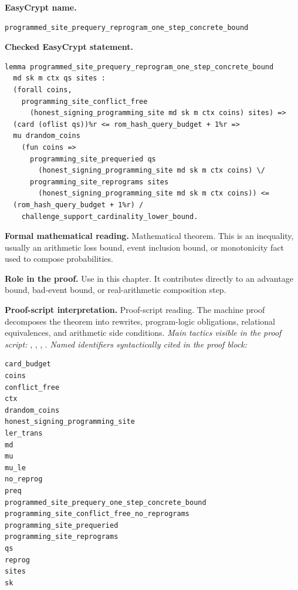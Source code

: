 \begin{formaltheorem}
\noindent\textbf{EasyCrypt name.}
\begin{lstlisting}[language=EasyCrypt,basicstyle=\ttfamily\scriptsize]
programmed_site_prequery_reprogram_one_step_concrete_bound
\end{lstlisting}
\noindent\textbf{Checked EasyCrypt statement.}
\begin{lstlisting}[language=EasyCrypt,basicstyle=\ttfamily\scriptsize]
lemma programmed_site_prequery_reprogram_one_step_concrete_bound
  md sk m ctx qs sites :
  (forall coins,
    programming_site_conflict_free
      (honest_signing_programming_site md sk m ctx coins) sites) =>
  (card (oflist qs))%r <= rom_hash_query_budget + 1%r =>
  mu drandom_coins
    (fun coins =>
      programming_site_prequeried qs
        (honest_signing_programming_site md sk m ctx coins) \/
      programming_site_reprograms sites
        (honest_signing_programming_site md sk m ctx coins)) <=
  (rom_hash_query_budget + 1%r) /
    challenge_support_cardinality_lower_bound.
\end{lstlisting}
\noindent\textbf{Formal mathematical reading.}
Mathematical theorem. This is an inequality, usually an arithmetic loss bound, event inclusion bound, or monotonicity fact used to compose probabilities.

\noindent\textbf{Role in the proof.}
Use in this chapter. It contributes directly to an advantage bound, bad-event bound, or real-arithmetic composition step.

\noindent\textbf{Proof-script interpretation.}
Proof-script reading. The machine proof decomposes the theorem into rewrites, program-logic obligations, relational equivalences, and arithmetic side conditions.
\emph{Main tactics visible in the proof script:} , , , .
\emph{Named identifiers syntactically cited in the proof block:}
\begin{lstlisting}[language=EasyCrypt,basicstyle=\ttfamily\scriptsize]
card_budget
coins
conflict_free
ctx
drandom_coins
honest_signing_programming_site
ler_trans
md
mu
mu_le
no_reprog
preq
programmed_site_prequery_one_step_concrete_bound
programming_site_conflict_free_no_reprograms
programming_site_prequeried
programming_site_reprograms
qs
reprog
sites
sk
\end{lstlisting}

\end{formaltheorem}

